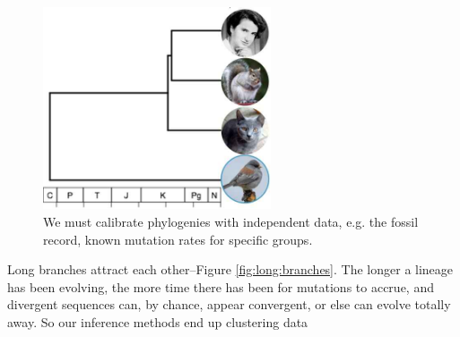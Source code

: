 \documentclass[]{article}
\begin{document}
\begin{figure}[H]
	\caption[We must calibrate 	phylogenies with independent data]{We must calibrate 	phylogenies with independent data, 	e.g. the fossil record, known mutation rates for specific groups.}\label{fig:calibrating-time}
	\includegraphics[width=0.6\textwidth]{calibrating-time}
\end{figure}
Long branches attract each other\cite{philippe2005heterotachy}--Figure \ref{fig:long:branches}. The longer a lineage has been evolving, the more time there has been for mutations to accrue, and divergent sequences can, by chance, appear convergent, or else can evolve totally away. So our inference methods end up clustering data
\end{document}
